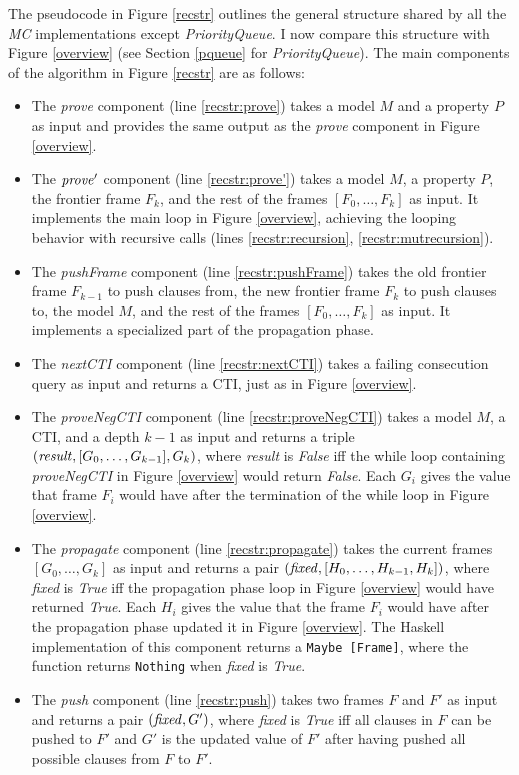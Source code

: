 \documentclass[12pt,a4paper,twoside,openright]{report}
\begin{document}
{{The pseudocode in Figure \ref{recstr}
outlines the general structure shared by all the \emph{MC}
implementations except {\it PriorityQueue}.
I now compare this structure with Figure \ref{overview} (see Section
\ref{pqueue} for \emph{PriorityQueue}).
The main components of the algorithm in Figure \ref{recstr} are as follows:
\begin{itemize}
\item The {\it prove} component (line \ref{recstr:prove})
takes a model $M$ and a property $P$ as input
 and provides the same output as the \emph{prove} component in Figure \ref{overview}.
\item The ${\it prove'}$ component (line \ref{recstr:prove'})
takes a model $M$, a property $P$,
the frontier frame $F_k$, and the rest of the frames $[F_0,\ldots,F_k]$ as input. It
implements the main loop in Figure \ref{overview}, achieving the looping behavior with
recursive calls (lines \ref{recstr:recursion}, \ref{recstr:mutrecursion}).
\item The {\it pushFrame} component (line \ref{recstr:pushFrame}) takes the old frontier frame
$F_{k - 1}$ to push clauses from, the new frontier frame $F_k$ to push clauses to,
the model $M$, and the rest of the frames $[F_0, \ldots, F_k]$ as input.
It implements a specialized part of the propagation phase.
\item The {\it nextCTI} component (line \ref{recstr:nextCTI})
takes a failing consecution query as input and returns
a CTI, just as in Figure \ref{overview}.
\item The {\it proveNegCTI} component (line \ref{recstr:proveNegCTI})
takes a model $M$, a CTI, and a depth $k - 1$ as input and
returns a triple $({\it result}, [G_0, \ldots, G_{k - 1}], G_k)$, where {\it result}
is {\it False} iff the while loop containing {\it proveNegCTI} in Figure \ref{overview}
would return {\it False}.
Each $G_i$ gives the value that frame $F_i$ would have after the termination of
the while loop in Figure \ref{overview}.
\item The {\it propagate} component (line \ref{recstr:propagate})
takes the current frames $[G_0, \ldots, G_k]$ as input and
returns a pair $({\it fixed}, [H_0, \ldots, H_{k-1}, H_k])$, where {\it fixed} is {\it True}
iff the propagation phase loop in Figure \ref{overview} would have returned {\it True}.
Each $H_i$ gives the value that the frame $F_i$ would have after the propagation
phase updated it in Figure \ref{overview}. The Haskell implementation of this component
returns a \verb,Maybe [Frame],, where the function returns \verb,Nothing,
when {\it fixed} is {\it True}.
\item The {\it push} component (line \ref{recstr:push})
takes two frames $F$ and $F'$ as input and returns a
pair $({\it fixed}, G')$, where {\it fixed} is {\it True} iff all clauses in $F$ can
be pushed to $F'$ and $G'$ is the updated value of $F'$ after having pushed all possible
clauses from $F$ to $F'$.
\end{itemize}

}}
\end{document}
